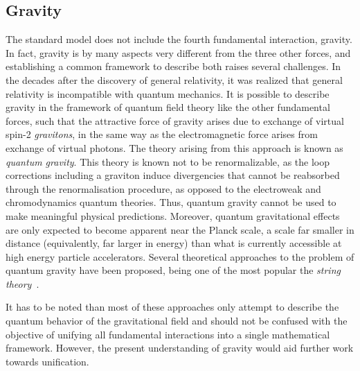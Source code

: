 \subsection*{Gravity}

The standard model does not include the fourth fundamental interaction, gravity.
In fact, gravity is by many aspects very different from the three other forces, and establishing a common framework to describe both raises several challenges.
In the decades after the discovery of general relativity, it was realized that general relativity is incompatible with quantum mechanics.
It is possible to describe gravity in the framework of quantum field theory like the other fundamental forces, such that the attractive force of gravity arises due to exchange of virtual spin-2 \textit{gravitons}, in the same way as the electromagnetic force arises from exchange of virtual photons. The theory arising from this approach is known as \textit{quantum gravity}.
This theory is known not to be renormalizable, as the loop corrections including a graviton induce divergencies that cannot be reabsorbed through the renormalisation procedure, as opposed to the electroweak and chromodynamics quantum theories. Thus, quantum gravity cannot be used to make meaningful physical predictions.
Moreover, quantum gravitational effects are only expected to become apparent near the Planck scale, a scale far smaller in distance (equivalently, far larger in energy) than what is currently accessible at high energy particle accelerators.
Several theoretical approaches to the problem of quantum gravity have been proposed, being one of the most popular the \textit{string theory}~\cite{StringTheory}.

It has to be noted than most of these approaches only attempt to describe the quantum behavior of the gravitational field and should not be confused with the objective of unifying all fundamental interactions into a single mathematical framework. However, the present understanding of gravity would aid further work towards unification.

